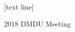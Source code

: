 
\def\begincols{\begin{columns}}
\def\begincol{\begin{column}}
\def\endcol{\end{column}}
\def\endcols{\end{columns}}

\AtBeginSubsection{}
\AtBeginSection{}

[text line]{%
  \parbox{\linewidth}{\vspace*{-8pt}2018 DMDU Meeting\hfill\insertshortauthor\hfill\insertpagenumber}}

